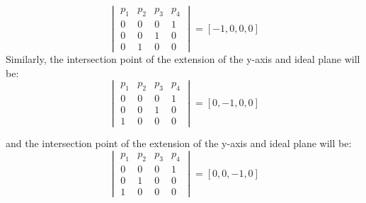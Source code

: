 \documentclass[11pt]{article}
\begin{document}
\begin{enumerate}
\begin{tcolorbox}
\begin{enumerate}[]
\begin{equation*}
    \begin{vmatrix}
        p_1 & p_2 & p_3 & p_4\\ 
        0 & 0& 0& 1\\
        0& 0& 1& 0\\
        0& 1& 0& 0
        \end{vmatrix} = [-1, 0, 0, 0]
\end{equation*}
Similarly, the intersection point of the extension of the y-axis and ideal plane will be:
\begin{equation*}
    \begin{vmatrix}
        p_1 & p_2 & p_3 & p_4\\ 
        0 & 0& 0& 1\\
        0& 0& 1& 0\\
        1& 0& 0& 0
        \end{vmatrix} = [0, -1, 0, 0]
\end{equation*}

and the intersection point of the extension of the y-axis and ideal plane will be:
\begin{equation*}
    \begin{vmatrix}
        p_1 & p_2 & p_3 & p_4\\ 
        0 & 0& 0& 1\\
        0& 1& 0& 0\\
        1& 0& 0& 0
        \end{vmatrix} = [0, 0, -1, 0]
\end{equation*}


\end{enumerate}


\end{tcolorbox}
\end{enumerate}
\end{document}
